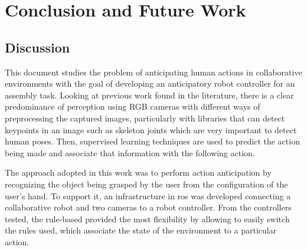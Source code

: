 \chapter{Conclusion and Future Work}
\label{chapter:conclusion}

\section{Discussion}

This document studies the problem of anticipating human actions in collaborative environments with the goal of developing an anticipatory robot controller for an assembly task. Looking at previous work found in the literature, there is a clear predominance of perception using RGB cameras with different ways of preprocessing the captured images, particularly with libraries that can detect keypoints in an image such as skeleton joints which are very important to detect human poses. Then, supervised learning techniques are used to predict the action being made and associate that information with the following action.



The approach adopted in this work was to perform action anticipation by recognizing the object being grasped by the user from the configuration of the user's hand. To support it, an infrastructure in \acs{ros} was developed connecting a collaborative robot and two cameras to a robot controller. From the controllers tested, the rule-based provided the most flexibility by allowing to easily switch the rules used, which associate the state of the environment to a particular action.

